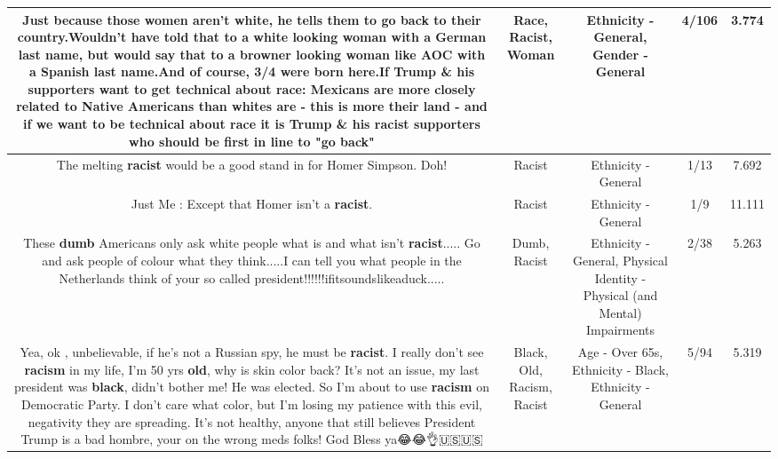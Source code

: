 \documentclass[11pt]{article}
\newlength\mylength
\begin{document}
\begin{center}
\begin{longtable}{|C{.65\mylength}|C{.30\mylength}|C{.12\mylength}|C{.12\mylength}|C{.12\mylength}|}
  \small Just because those women aren't white, he tells them to go back to their country.Wouldn't have told that to a white looking \textbf{woman} with a German last name, but would say that to a browner looking \textbf{woman} like AOC with a Spanish last name.And of course, 3/4 were born here.If Trump \& his supporters want to get technical about \textbf{race}:  Mexicans are more closely related to Native Americans than whites are - this is more their land - and if we want to be technical about \textbf{race} it is Trump \& his \textbf{racist} supporters who should be first in line to "go back"\normalsize   & Race, Racist, Woman & Ethnicity - General, Gender - General & 4/106 & 3.774 \\  \hline
  \small The melting \textbf{racist} would be a good stand in for Homer Simpson. Doh!\normalsize   & Racist & Ethnicity - General & 1/13 & 7.692 \\  \hline
  \small Just Me : Except that Homer isn't a \textbf{racist}.\normalsize   & Racist & Ethnicity - General & 1/9 & 11.111 \\  \hline
  \small These \textbf{dumb} Americans only ask white people what is and what isn't \textbf{racist}..... Go and ask people of colour what they think.....I can tell you what people in the Netherlands think of your so called president!!!!!!ifitsoundslikeaduck.....\normalsize   & Dumb, Racist & Ethnicity - General, Physical Identity - Physical (and Mental) Impairments & 2/38 & 5.263 \\  \hline
  \small Yea, ok ,  unbelievable,  if he's not a Russian spy, he must be \textbf{racist}. I really don't see \textbf{racism} in my life, I'm 50 yrs \textbf{old}, why is skin color back? It's not an issue, my last president was \textbf{black}, didn't bother me! He was elected. So I'm about to use \textbf{racism} on Democratic Party. I don't care what color, but I'm losing my patience with this evil, negativity they are spreading. It's not healthy, anyone that still believes President Trump is a bad hombre, your on the wrong meds folks! God Bless ya😂😂👌🇺🇸🇺🇸\normalsize   & Black, Old, Racism, Racist & Age - Over 65s, Ethnicity - Black, Ethnicity - General & 5/94 & 5.319 \\  \hline

\end{longtable}
\end{center}
\end{document}
